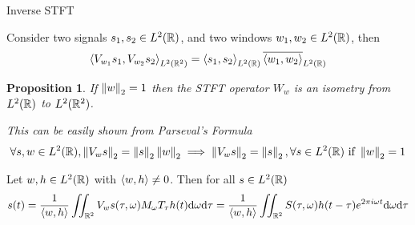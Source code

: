 \documentclass[10pt,american,ignorenonframetext,aspectratio=1610]{beamer}
\newtheorem{prop}{Proposition}[section]
\theoremstyle{remark}
\begin{document}
\begin{frame}{Inverse STFT}
\protect\hypertarget{inverse-stft}{}

\begin{theorem}
Consider two signals $s_1,s_2\in L^2(\mathbb{R})$, and two windows $w_1,w_2\in L^2(\mathbb{R})$, then
$$ \left\langle V_{w_1}s_1,V_{w_2}s_2\right\rangle_{L^2(\mathbb{R}^2)} =
   \left\langle s_1,s_2\right\rangle_{L^2(\mathbb{R})} \overline{\left\langle w_1,w_2\right\rangle}_{L^2(\mathbb{R})} $$
\end{theorem}

\begin{prop}
If $\left\lVert w\right\rVert_2=1$ then the STFT operator $W_w$ is an isometry from $L^2(\mathbb{R})$ to $L^2(\mathbb{R}^2)$.\par
This can be easily shown from Parseval's Formula
$$ \forall s,w\in L^2(\mathbb{R}), \left\lVert V_w s\right\rVert_2=\left\lVert s\right\rVert_2 \left\lVert w\right\rVert_2\implies 
  \left\lVert V_w s\right\rVert_2=\left\lVert s\right\rVert_2,\forall s\in L^2(\mathbb{R})~\text{if}~\left\lVert w\right\rVert_2=1$$
\end{prop}

\begin{theorem}
Let $w,h\in L^2(\mathbb{R})$ with $\left\langle w,h\right\rangle\neq0$. Then for all $s\in L^2(\mathbb{R})$
$$s(t) = \frac{1}{\left\langle w,h\right\rangle} \iint_{\mathbb{R}^2}V_w s(\tau,\omega)M_\omega T_\tau h(t) \mathrm{d}\omega\mathrm{d}\tau
       = \frac{1}{\left\langle w,h\right\rangle} \iint_{\mathbb{R}^2} S(\tau,\omega) h(t-\tau) e^{2\pi i\omega t} \mathrm{d}\omega\mathrm{d}\tau $$
\end{theorem}

\end{frame}
\end{document}
